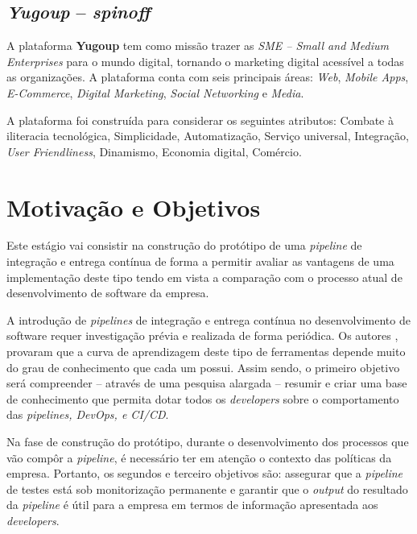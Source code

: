 \subsection{\textit{Yugoup} -- \textit{spinoff}}

\hspace{1cm}A plataforma \textbf{Yugoup} tem como missão trazer as \textit{SME -- Small and Medium Enterprises} para o mundo digital, tornando o marketing digital acessível a todas as organizações. A plataforma conta com seis principais áreas: \textit{Web}, \textit{Mobile Apps}, \textit{E-Commerce}, \textit{Digital Marketing}, \textit{Social Networking} e \textit{Media}.

\hspace{1cm}A plataforma \textbf{} foi construída para considerar os seguintes atributos: Combate à iliteracia tecnológica, Simplicidade, Automatização, Serviço universal, Integração, \textit{User Friendliness}, Dinamismo, Economia digital, Comércio.


\section{Motivação e Objetivos}
\hspace{1cm}Este estágio vai consistir na construção do protótipo de uma \textit{pipeline} de integração e entrega contínua de forma a permitir avaliar as vantagens de uma implementação deste tipo tendo em vista a comparação com o processo atual de desenvolvimento de software da empresa.

\hspace{1cm}A introdução de \textit{pipelines} de integração e entrega contínua no desenvolvimento de software requer investigação prévia e realizada de forma periódica. Os autores , provaram que a curva de aprendizagem deste tipo de ferramentas depende muito do grau de conhecimento que cada um possui. Assim sendo, o primeiro objetivo será compreender -- através de uma pesquisa alargada -- resumir e criar uma base de conhecimento que permita dotar todos os \textit{developers} sobre o comportamento das \textit{pipelines, DevOps, e CI/CD}.

\hspace{1cm}Na fase de construção do protótipo, durante o desenvolvimento dos processos que vão compôr a \textit{pipeline}, é necessário ter em atenção o contexto das políticas da empresa. Portanto, os segundos e terceiro objetivos são: assegurar que a \textit{pipeline} de testes está sob monitorização permanente e garantir que o \textit{output} do resultado da \textit{pipeline} é útil para a empresa em termos de informação apresentada aos \textit{developers}.

